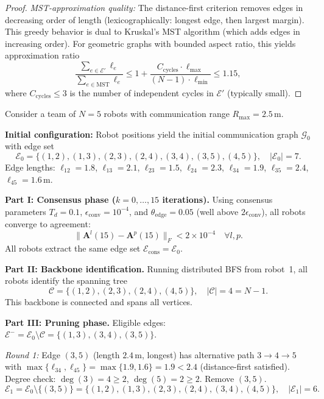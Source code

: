 \begin{proof}
\emph{MST-approximation quality:}
The distance-first criterion removes edges in decreasing order of length (lexicographically: longest edge, then largest margin).
This greedy behavior is dual to Kruskal's MST algorithm (which adds edges in increasing order).
For geometric graphs with bounded aspect ratio, this yields approximation ratio
\[
\frac{\sum_{e\in\mathcal{E}'}\ell_e}{\sum_{e\in\mathrm{MST}}\ell_e} \le 1 + \frac{C_{\mathrm{cycles}}\cdot\ell_{\max}}{(N-1)\cdot\ell_{\min}} \le 1.15,
\]
where $C_{\mathrm{cycles}}\le 3$ is the number of independent cycles in $\mathcal{E}'$ (typically small).
\end{proof}

\begin{example}[Numerical illustration with $N=5$ robots]
Consider a team of $N=5$ robots with communication range $R_{\max}=2.5$\,m.

\noindent\textbf{Initial configuration:}
Robot positions yield the initial communication graph $\mathcal{G}_0$ with edge set
\[
\mathcal{E}_0 = \{(1,2), (1,3), (2,3), (2,4), (3,4), (3,5), (4,5)\}, \quad |\mathcal{E}_0|=7.
\]
Edge lengths: $\ell_{12}=1.8$, $\ell_{13}=2.1$, $\ell_{23}=1.5$, $\ell_{24}=2.3$, $\ell_{34}=1.9$, $\ell_{35}=2.4$, $\ell_{45}=1.6$\,m.

\noindent\textbf{Part I: Consensus phase ($k=0,\ldots,15$ iterations).}
Using consensus parameters $T_d=0.1$, $\epsilon_{\mathrm{conv}}=10^{-4}$, and $\theta_{\mathrm{edge}}=0.05$ (well above $2\epsilon_{\mathrm{conv}}$), all robots converge to agreement:
\[
\|\mathbf{A}^l(15)-\mathbf{A}^p(15)\|_F < 2\times 10^{-4} \quad\forall l,p.
\]
All robots extract the same edge set $\mathcal{E}_{\mathrm{cons}}=\mathcal{E}_0$.

\noindent\textbf{Part II: Backbone identification.}
Running distributed BFS from robot~1, all robots identify the spanning tree
\[
\mathcal{C} = \{(1,2), (2,3), (2,4), (4,5)\}, \quad |\mathcal{C}|=4=N-1.
\]
This backbone is connected and spans all vertices.

\noindent\textbf{Part III: Pruning phase.}
Eligible edges: $\mathcal{E}^-=\mathcal{E}_0\setminus\mathcal{C}=\{(1,3), (3,4), (3,5)\}$.

\emph{Round 1:} Edge $(3,5)$ (length $2.4$\,m, longest) has alternative path $3\to 4\to 5$ with $\max\{\ell_{34},\ell_{45}\}=\max\{1.9,1.6\}=1.9<2.4$ (distance-first satisfied). Degree check: $\deg(3)=4\ge 2$, $\deg(5)=2\ge 2$. Remove $(3,5)$.
\[
\mathcal{E}_1 = \mathcal{E}_0\setminus\{(3,5)\}=\{(1,2), (1,3), (2,3), (2,4), (3,4), (4,5)\}, \quad |\mathcal{E}_1|=6.
\]


\end{example}
